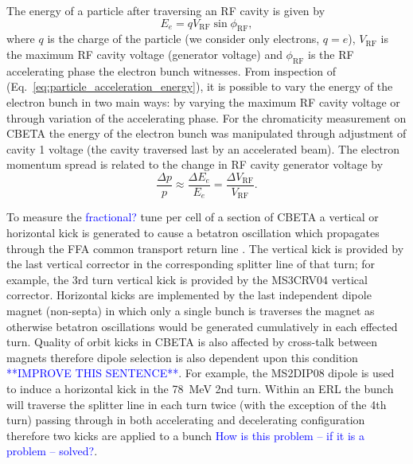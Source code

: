 \documentclass[../main.tex]{subfiles}
\begin{document}
The energy of a particle after traversing an RF cavity is given by
\begin{equation}
E_{e} = qV_{\mathrm{RF}}\sin\phi_{\mathrm{RF}},
\label{eq:particle_acceleration_energy}
\end{equation}
where $q$ is the charge of the particle (we consider only electrons, $q=e$), $V_{\mathrm{RF}}$ is the maximum RF cavity voltage (generator voltage) and $\phi_{\mathrm{RF}}$ is the RF accelerating phase the electron bunch witnesses. From inspection of (Eq.~\ref{eq:particle_acceleration_energy}), it is possible to vary the energy of the electron bunch in two main ways: by varying the maximum RF cavity voltage or through variation of the accelerating phase. For the chromaticity measurement on CBETA the energy of the electron bunch was manipulated through adjustment of cavity 1 voltage (the cavity traversed last by an accelerated beam). The electron momentum spread is related to the change in RF cavity generator voltage by
\begin{equation}
\frac{\Delta p}{p}\approx \frac{\Delta E_{e}}{E_{e}} = \frac{\Delta V_{\mathrm{RF}}}{V_{\mathrm{RF}}}.    
\end{equation}

To measure the \textcolor{blue}{fractional?} tune per cell of a section of CBETA a vertical or horizontal kick is generated to cause a betatron oscillation which propagates through the FFA common transport return line \cite{gulliford2021measurement}. The vertical kick is provided by the last vertical corrector in the corresponding splitter line of that turn; for example, the 3rd turn vertical kick is provided by the MS3CRV04 vertical corrector. Horizontal kicks are implemented by the last independent dipole magnet (non-septa) in which only a single bunch is traverses the magnet as otherwise betatron oscillations would be generated cumulatively in each effected turn. Quality of orbit kicks in CBETA is also affected by cross-talk between magnets therefore dipole selection is also dependent upon this condition \textcolor{blue}{**IMPROVE THIS SENTENCE**}. For example, the MS2DIP08 dipole is used to induce a horizontal kick in the 78~\si{\mega\electronvolt} 2nd turn. Within an ERL the bunch will traverse the splitter line in each turn twice (with the exception of the 4th turn) passing through in both accelerating and decelerating configuration therefore two kicks are applied to a bunch \textcolor{blue}{How is this problem -- if it is a problem -- solved?}.     
\end{document}
